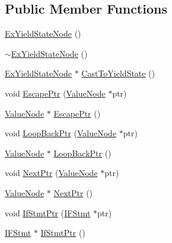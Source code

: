 \subsection*{Public Member Functions}
\begin{DoxyCompactItemize}
\item 
\hyperlink{classmocha_1_1_ex_yield_state_node_addba376fc64693d3ff965dd7dcad0376}{ExYieldStateNode} ()
\item 
\hyperlink{classmocha_1_1_ex_yield_state_node_a1264a12271fd2c35c498518bb90dfedf}{$\sim$ExYieldStateNode} ()
\item 
\hyperlink{classmocha_1_1_ex_yield_state_node}{ExYieldStateNode} $\ast$ \hyperlink{classmocha_1_1_ex_yield_state_node_a5ca3856c558729bde56291fffd67f6aa}{CastToYieldState} ()
\item 
void \hyperlink{classmocha_1_1_ex_yield_state_node_a440502e981bb954e1c2a30f1a08421a6}{EscapePtr} (\hyperlink{classmocha_1_1_value_node}{ValueNode} $\ast$ptr)
\item 
\hyperlink{classmocha_1_1_value_node}{ValueNode} $\ast$ \hyperlink{classmocha_1_1_ex_yield_state_node_aa984ae10eb8433fa5c33f39ef65992c9}{EscapePtr} ()
\item 
void \hyperlink{classmocha_1_1_ex_yield_state_node_ab962dabbd734a8924c496d6b6ead4925}{LoopBackPtr} (\hyperlink{classmocha_1_1_value_node}{ValueNode} $\ast$ptr)
\item 
\hyperlink{classmocha_1_1_value_node}{ValueNode} $\ast$ \hyperlink{classmocha_1_1_ex_yield_state_node_a5281b200e431460d5b85af98ade7023a}{LoopBackPtr} ()
\item 
void \hyperlink{classmocha_1_1_ex_yield_state_node_a34b9392df493e8e2742057583671425f}{NextPtr} (\hyperlink{classmocha_1_1_value_node}{ValueNode} $\ast$ptr)
\item 
\hyperlink{classmocha_1_1_value_node}{ValueNode} $\ast$ \hyperlink{classmocha_1_1_ex_yield_state_node_a56a0c81549b486dbe5c08427ac015d25}{NextPtr} ()
\item 
void \hyperlink{classmocha_1_1_ex_yield_state_node_ae2b166cc09a3814db96915fdb6a17caf}{IfStmtPtr} (\hyperlink{classmocha_1_1_i_f_stmt}{IFStmt} $\ast$ptr)
\item 
\hyperlink{classmocha_1_1_i_f_stmt}{IFStmt} $\ast$ \hyperlink{classmocha_1_1_ex_yield_state_node_a3e8b19e1d655e8757a900d57f905e591}{IfStmtPtr} ()
\end{DoxyCompactItemize}
